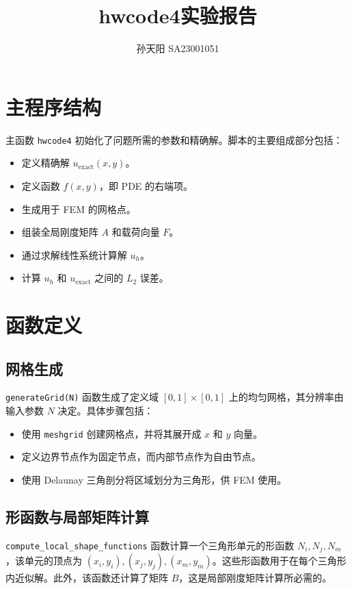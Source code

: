 \documentclass{article}
\title{hwcode4实验报告}
\author{孙天阳 SA23001051}
\begin{document}
\maketitle
\section{主程序结构}
主函数 \texttt{hwcode4} 初始化了问题所需的参数和精确解。脚本的主要组成部分包括：
\begin{itemize}
    \item 定义精确解 \( u_{\text{exact}}(x, y) \)。
    \item 定义函数 \( f(x, y) \)，即 PDE 的右端项。
    \item 生成用于 FEM 的网格点。
    \item 组装全局刚度矩阵 \( A \) 和载荷向量 \( F \)。
    \item 通过求解线性系统计算解 \( u_h \)。
    \item 计算 \( u_h \) 和 \( u_{\text{exact}} \) 之间的 \( L_2 \) 误差。
\end{itemize}

\section{函数定义}

\subsection{网格生成}
\texttt{generateGrid(N)} 函数生成了定义域 \([0, 1] \times [0, 1]\) 上的均匀网格，其分辨率由输入参数 \( N \) 决定。具体步骤包括：
\begin{itemize}
    \item 使用 \texttt{meshgrid} 创建网格点，并将其展开成 \( x \) 和 \( y \) 向量。
    \item 定义边界节点作为固定节点，而内部节点作为自由节点。
    \item 使用 Delaunay 三角剖分将区域划分为三角形，供 FEM 使用。
\end{itemize}

\subsection{形函数与局部矩阵计算}
\texttt{compute\_local\_shape\_functions} 函数计算一个三角形单元的形函数 \( N_i, N_j, N_m \)，该单元的顶点为 \((x_i, y_i), (x_j, y_j), (x_m, y_m)\)。这些形函数用于在每个三角形内近似解。此外，该函数还计算了矩阵 \( B \)，这是局部刚度矩阵计算所必需的。
\end{document}
